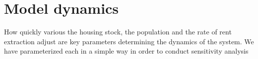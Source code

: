 \section{Model dynamics}
How quickly various the housing stock, the population and the rate of rent extraction adjust are key parameters determining the dynamics of the system. We have parameterized each in a simple way in order to conduct sensitivity analysis